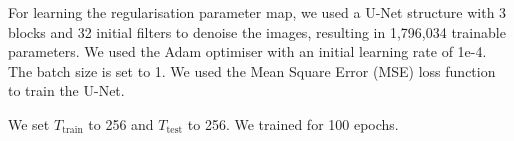 \documentclass[12pt]{article}
\begin{document}



For learning the regularisation parameter map, we used a U-Net structure with 3 blocks and 32 initial filters to denoise the images, resulting in 1,796,034 trainable parameters.
We used the Adam optimiser with an initial learning rate of 1e-4.
The batch size is set to 1.
We used the Mean Square Error (MSE) loss function to train the U-Net.

We set $T_{\text{train}}$ to 256 and $T_{\text{test}}$ to 256.
We trained for 100 epochs.







\end{document}
